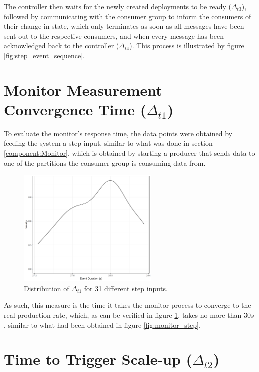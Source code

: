 The controller then waits for the newly created deployments to be ready
($\Delta_{t3}$), followed by communicating with the consumer group to inform the
consumers of their change in state, which only terminates as
soon as all messages have been sent out to the respective consumers, and when every message
has been acknowledged back to the controller ($\Delta_{t4}$). This process is illustrated
by figure \ref{fig:step_event_sequence}.


\section{Monitor Measurement Convergence Time ($\Delta_{t1}$)}
\label{c3sec:MonitorMeasurement}

To evaluate the monitor's response time, the data points were obtained by
feeding the system a step input, similar to what was done in section
\ref{component:Monitor}, which is obtained by starting a producer that sends
data to one of the partitions the consumer group is consuming data from.

\begin{figure}[H]
\centering
\includegraphics[width=0.6\textwidth]{images/integration/delta1.png}
\caption{
    Distribution of $\Delta_{t1}$ for 31 different step inputs.
}
\label{fig:controller_result_monitor}
\end{figure}

As such, this measure is the time it takes the monitor process to converge to
the real production rate, which, as can be verified in figure
\ref{fig:controller_result_monitor}, takes no more than $30s$, similar to what
had been obtained in figure \ref{fig:monitor_step}.

\section{Time to Trigger Scale-up ($\Delta_{t2}$)}

